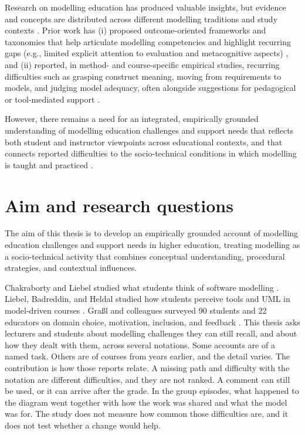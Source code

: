 Research on modelling education has produced valuable insights, but evidence and concepts are distributed across different modelling traditions and study contexts \cite{maslov2025conceptual}. Prior work has (i) proposed outcome-oriented frameworks and taxonomies that help articulate modelling competencies and highlight recurring gaps (e.g., limited explicit attention to evaluation and metacognitive aspects) \cite{bogdanova2019camelot,bogdanova2017domain,bork2019framework}, and (ii) reported, in method- and course-specific empirical studies, recurring difficulties such as grasping construct meaning, moving from requirements to models, and judging model adequacy, often alongside suggestions for pedagogical or tool-mediated support \cite{istar-learning,bpmn-education}.

However, there remains a need for an integrated, empirically grounded understanding of modelling education challenges and support needs that reflects both student and instructor viewpoints across educational contexts, and that connects reported difficulties to the socio-technical conditions in which modelling is taught and practiced \cite{liebel2017model,maslov2025conceptual}.

\section{Aim and research questions}
\label{sec:intro_aim_rq}

The aim of this thesis is to develop an empirically grounded account of modelling education challenges and support needs in higher education, treating modelling as a socio-technical activity that combines conceptual understanding, procedural strategies, and contextual influences.

Chakraborty and Liebel studied what students think of software modelling \cite{chakraborty2022perceptions}. Liebel, Badreddin, and Heldal studied how students perceive tools and UML in model-driven courses \cite{liebel2017model}. Gra{\ss}l and colleagues surveyed 90 students and 22 educators on domain choice, motivation, inclusion, and feedback \cite{grassl2026dei}. This thesis asks lecturers and students about modelling challenges they can still recall, and about how they dealt with them, across several notations. Some accounts are of a named task. Others are of courses from years earlier, and the detail varies. The contribution is how those reports relate. A missing path and difficulty with the notation are different difficulties, and they are not ranked. A comment can still be used, or it can arrive after the grade. In the group episodes, what happened to the diagram went together with how the work was shared and what the model was for. The study does not measure how common those difficulties are, and it does not test whether a change would help.

